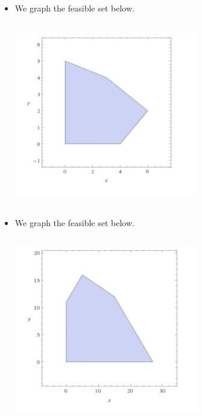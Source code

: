 \documentclass[12pt]{article}
\newenvironment{problem}[2][Problem]{\begin{trivlist}
\item[\hskip \labelsep {\bfseries #1}\hskip \labelsep {\bfseries #2}]}{\end{trivlist}}
\begin{document}
\begin{problem}{8.2.}\hfill
\begin{itemize}
\item[(i)]We graph the feasible set below. 
\begin{center}
\includegraphics[width=8cm, height=8cm]{prob8i}
\end{center}
\item[(ii)]We graph the feasible set below. 
\begin{center}
\includegraphics[width=8cm, height=8cm]{prob8ii}
\end{center}
\end{itemize}
\end{problem}

\begin{problem}{8.5.}
\end{problem}

\begin{problem}{8.7.} 
\end{problem}

\begin{problem}{8.13.} 
\end{problem}

\begin{problem}{8.17.} 
\end{problem}

\begin{problem}{8.18.} 
\end{problem}

\begin{problem}{9.3.}
\end{problem}

\begin{problem}{9.6.}
\end{problem}

\begin{problem}{9.7.}
\end{problem}

\begin{problem}{9.10.}
\end{problem}
\end{document}
